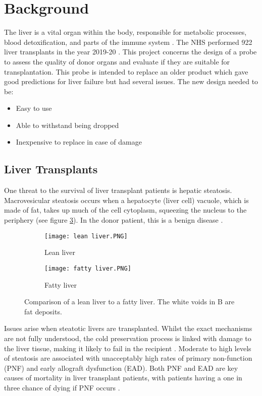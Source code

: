 \section{Background}

The liver is a vital organ within the body, responsible for metabolic processes, blood detoxification, and parts of the immune system \cite{liver_background}. The NHS performed 922 liver transplants in the year 2019-20 \cite{nhs_transplants}. This project concerns the design of a probe to assess the quality of donor organs and evaluate if they are suitable for transplantation. This probe is intended to replace an older product which gave good predictions for liver failure but had several issues. The new design needed to be:

\begin{itemize}[noitemsep, nolistsep]
\item Easy to use
\item Able to withstand being dropped
\item Inexpensive to replace in case of damage
\end{itemize}


\subsection{Liver Transplants}
One threat to the survival of liver transplant patients is hepatic steatosis. Macrovesicular steatosis occurs when a hepatocyte (liver cell) vacuole, which is made of fat, takes up much of the cell cytoplasm, squeezing the nucleus to the periphery (see figure \ref{fig: livers}). In the donor patient, this is a benign disease \cite{Imber2002}.\\

\begin{figure}[htb]
	\centering
	\begin{subfigure}[b]{0.4\linewidth}
		\texttt{[image: lean liver.PNG]}
		\caption{Lean liver \cite{Bruno2008}}
		\label{}
	\end{subfigure}
	\begin{subfigure}[b]{0.4\linewidth}
		\texttt{[image: fatty liver.PNG]}
		\caption{Fatty liver \cite{Bruno2008}}
		\label{fig: fatty liver}
	\end{subfigure}
	\caption{Comparison of a lean liver to a fatty liver. The white voids in B are fat deposits.}
	\label{fig: livers}
\end{figure}	


Issues arise when steatotic livers are transplanted. Whilst the exact mechanisms are not fully understood, the cold preservation process is linked with damage to the liver tissue, making it likely to fail in the recipient \cite{Imber2002}. Moderate to high levels of steatosis are associated with unacceptably high rates of primary non-function (PNF) and early allograft dysfunction (EAD). Both PNF and EAD are key causes of mortality in liver transplant patients, with patients having a one in three chance of dying if PNF occurs \cite{Robertson}.\\

